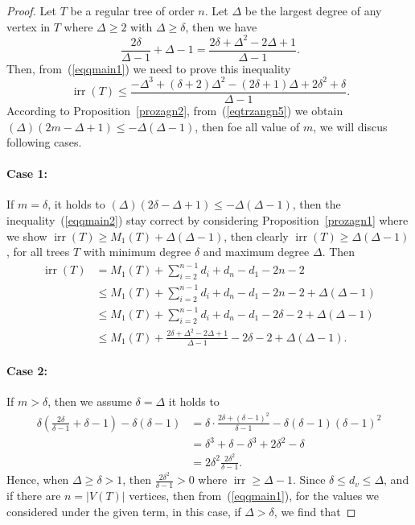 \documentclass[12pt]{amsart}
\newcommand{\irr}{\operatorname{irr}}
\newcommand{\case}[1]{\paragraph*{Case #1:}}
\begin{document}
\begin{proof}
Let $T$ be a regular tree of order $n$. Let $\Delta$ be the largest degree of any vertex in $T$ where $\Delta\geq 2$ with $\Delta\geq \delta$, then we have
\begin{equation}~\label{eqqmain1}
    \frac{2\delta}{\Delta - 1} + \Delta - 1 =\frac{2\delta+\Delta^2-2\Delta+1}{\Delta-1}.
\end{equation} 
Then, from~(\ref{eqqmain1}) we need to prove this inequality 
\begin{equation}~\label{eqqmain2}
    \irr(T) \leq \frac{-\Delta^3 + (\delta + 2)\Delta^2 - (2\delta + 1)\Delta + 2\delta^2 + \delta}{\Delta - 1}.
\end{equation}
According to Proposition~\ref{prozagn2}, from~(\ref{eqtrzangn5}) we obtain $(\Delta)(2m-\Delta+1)\leq -\Delta(\Delta-1)$, then foe all value of $m$, we will discus following cases.
\case{1} If $m=\delta$, it holds to $(\Delta)(2\delta-\Delta+1)\leq -\Delta(\Delta-1)$, then the inequality~(\ref{eqqmain2}) stay correct by considering Proposition~\ref{prozagn1} where we show $\irr(T)\geq M_1(T)+\Delta(\Delta-1)$, then clearly $\irr(T)\geq \Delta(\Delta-1)$, for all trees $T$ with minimum degree $\delta$  and maximum degree 
$\Delta$.  Then 
\begin{align*}
    \irr(T)&=M_1(T)+\sum_{i=2}^{n-1} d_i+d_n - d_1-2n-2\\
    &\leq M_1(T)+\sum_{i=2}^{n-1} d_i+d_n - d_1-2n-2+\Delta(\Delta-1)\\
    &\leq M_1(T)+\sum_{i=2}^{n-1} d_i+d_n - d_1-2\delta-2+\Delta(\Delta-1)\\
    & \leq M_1(T)+\frac{2\delta+\Delta^2-2\Delta+1}{\Delta-1}-2\delta-2+\Delta(\Delta-1).
\end{align*}
\case{2} If $m>\delta$, then we assume $\delta=\Delta$ it holds to
\begin{align*}
    \delta \left( \frac{2\delta}{\delta - 1} + \delta - 1 \right) - \delta (\delta - 1) &= \delta \cdot \frac{2\delta + (\delta - 1)^2}{\delta - 1} - \delta (\delta - 1)(\delta - 1)^2\\
&= \delta^3 + \delta - \delta^3 + 2\delta^2 - \delta\\
&= 2\delta^2
\frac{2\delta^2}{\delta - 1}.
\end{align*}
Hence, when $\Delta\geqslant \delta>1$, then $\frac{2\delta^2}{\delta - 1}>0$ where $\irr\geq \Delta-1$. Since $\delta \leq d_v \leq \Delta$, and if there are $n = |V(T)|$ vertices, then from~(\ref{eqqmain1}), for the values we considered under the given term, in this case, if $\Delta>\delta$, we find that

\end{proof}
\end{document}
